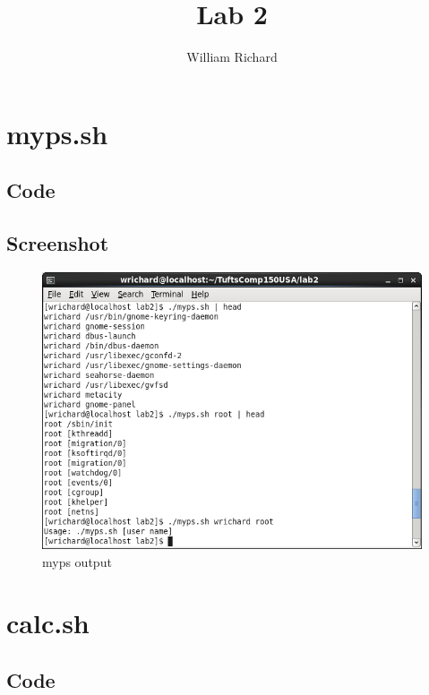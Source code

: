 \documentclass[a4paper,10pt]{article}
\title{Lab 2}
\author{William Richard}
\begin{document}
\maketitle

\section{myps.sh}

\subsection{Code}


\subsection{Screenshot}
\begin{figure}[H]
 \centering
 \includegraphics[width=\linewidth]{./myps.png}
 \caption{myps output}
 \label{fig:myps}
\end{figure}

\section{calc.sh}

\subsection{Code}

\end{document}
